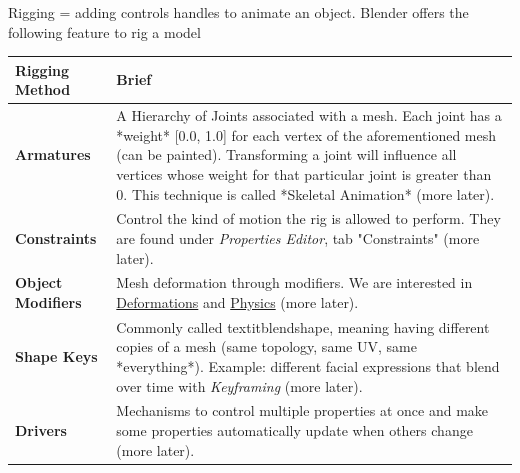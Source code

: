 \documentclass{article}
\begin{document}
Rigging = adding controls handles to animate an object. Blender offers the following feature to rig a model
\begin{longtable}{p{}p{}}
    \toprule
    \textbf{Rigging Method}   & \textbf{Brief}                                                                                                                                                                                                                                                                                                         \\
    \midrule
    \endhead
    \bottomrule
    \endfoot

    \textbf{Armatures}        & A Hierarchy of Joints associated with a mesh. Each joint has a *weight* [0.0, 1.0] for each vertex of the aforementioned mesh (can be painted). Transforming a joint will influence all vertices whose weight for that particular joint is greater than 0. This technique is called *Skeletal Animation* (more later). \\
    \textbf{Constraints}      & Control the kind of motion the rig is allowed to perform. They are found under \textit{Properties Editor}, tab "Constraints" (more later).                                                                                                                                                                             \\
    \textbf{Object Modifiers} & Mesh deformation through modifiers. We are interested in \href{https://docs.blender.org/manual/en/4.3/modeling/modifiers/deform/index.html}{Deformations} and \href{https://docs.blender.org/manual/en/4.3/modeling/modifiers/physics/index.html}{Physics} (more later).                                               \\
    \textbf{Shape Keys}       & Commonly called textit{blendshape}, meaning having different copies of a mesh (same topology, same UV, same *everything*). Example: different facial expressions that blend over time with \textit{Keyframing} (more later).                                                                                           \\
    \textbf{Drivers}          & Mechanisms to control multiple properties at once and make some properties automatically update when others change (more later).                                                                                                                                                                                       \\
\end{longtable}
\end{document}
